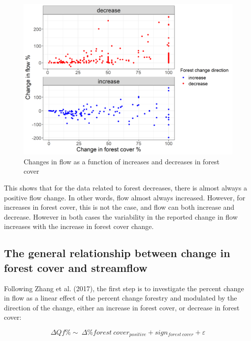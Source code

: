 \documentclass[]{elsarticle} %
\begin{document}
\begin{figure}
\includegraphics[width=0.9\linewidth]{Increase_decrease} \caption{Changes in flow as a function of increases and decreases in forest cover}\label{fig:increasedecrease}
\end{figure}

This shows that for the data related to forest decreases, there is almost always a positive flow change. In other words, flow almost always increased. However, for increases in forest cover, this is not the case, and flow can both increase and decrease. However in both cases the variability in the reported change in flow increases with the increase in forest cover change.

\hypertarget{the-general-relationship-between-change-in-forest-cover-and-streamflow}{%
\subsection{The general relationship between change in forest cover and streamflow}\label{the-general-relationship-between-change-in-forest-cover-and-streamflow}}

Following Zhang et al. (2017), the first step is to investigate the percent change in flow as a linear effect of the percent change forestry and modulated by the direction of the change, either an increase in forest cover, or decrease in forest cover:

\begin{equation}
\Delta Qf \% \sim ~ \Delta \% forest~cover_{positive} + sign_{forest~cover} + \varepsilon \label{eq:eq3}
\end{equation}
\end{document}

